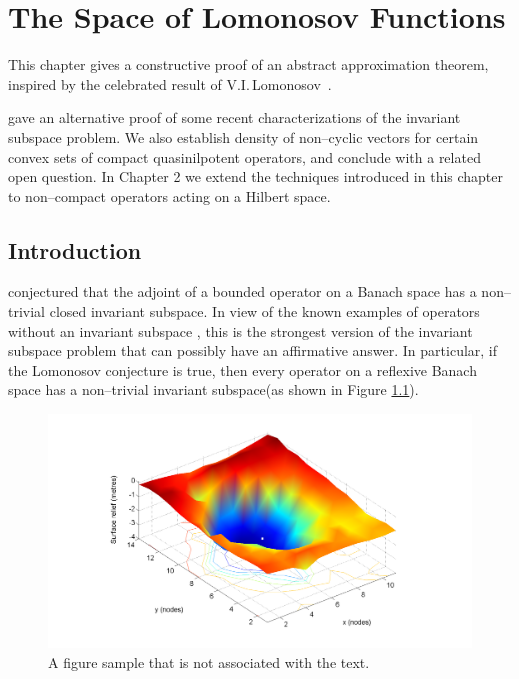 \def\baselinestretch{1}

\chapter{The Space of Lomonosov Functions}

\def\baselinestretch{1.66}


This chapter gives a constructive proof of an abstract
approximation theorem, inspired by the celebrated result of
V.I.\,Lomonosov~\citep{Lom73}. 

\citet{AAB95} gave an alternative proof of some recent characterizations of the
invariant subspace problem. We also
establish density of non--cyclic vectors for certain convex
sets of compact quasinilpotent operators, and conclude with a
related open question. In Chapter 2 we extend the techniques
introduced in this chapter to non--compact operators acting on
a Hilbert space.

\smallskip

\goodbreak
\section{Introduction}

\citet{Lom91} conjectured that the
adjoint of a bounded operator on a Banach space has a
non--trivial closed invariant subspace. In view of the known
examples of operators without an invariant subspace
\citep{Enf87,Rea85}, this is the strongest version of the
invariant subspace problem that can possibly have an
affirmative answer. In particular, if the Lomonosov conjecture
is true, then every operator on a reflexive Banach space has a
non--trivial invariant subspace(as shown in Figure \ref{fig1}).

\begin{figure}
\centering
\includegraphics[scale=0.25]{fig1}
\caption{A figure sample that is not associated with the text.}
\label{fig1}
\end{figure}

